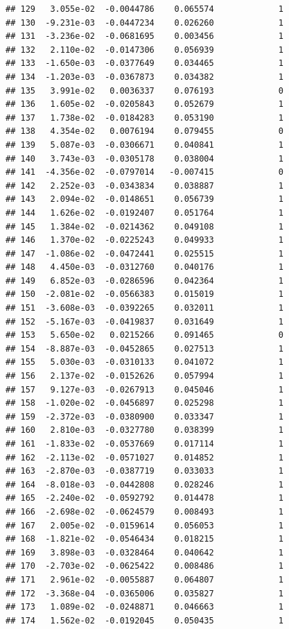 \documentclass[12pt]{article}\usepackage[]{graphicx}\usepackage[]{xcolor}
\makeatletter
\newenvironment{kframe}{%
 \def\at@end@of@kframe{}%
 \ifinner\ifhmode%
  \def\at@end@of@kframe{\end{minipage}}%
  \begin{minipage}{\columnwidth}%
 \fi\fi%
 \def\FrameCommand##1{\hskip\@totalleftmargin \hskip-\fboxsep
 \colorbox{shadecolor}{##1}\hskip-\fboxsep
     \hskip-\linewidth \hskip-\@totalleftmargin \hskip\columnwidth}%
 \MakeFramed {\advance\hsize-\width
   \@totalleftmargin\z@ \linewidth\hsize
   \@setminipage}}%
 {\par\unskip\endMakeFramed%
 \at@end@of@kframe}
\newenvironment{knitrout}{}{} %
\makeatother
\begin{document}
\begin{knitrout}
\begin{kframe}
\begin{verbatim}
## 129   3.055e-02  -0.0044786    0.065574             1
## 130  -9.231e-03  -0.0447234    0.026260             1
## 131  -3.236e-02  -0.0681695    0.003456             1
## 132   2.110e-02  -0.0147306    0.056939             1
## 133  -1.650e-03  -0.0377649    0.034465             1
## 134  -1.203e-03  -0.0367873    0.034382             1
## 135   3.991e-02   0.0036337    0.076193             0
## 136   1.605e-02  -0.0205843    0.052679             1
## 137   1.738e-02  -0.0184283    0.053190             1
## 138   4.354e-02   0.0076194    0.079455             0
## 139   5.087e-03  -0.0306671    0.040841             1
## 140   3.743e-03  -0.0305178    0.038004             1
## 141  -4.356e-02  -0.0797014   -0.007415             0
## 142   2.252e-03  -0.0343834    0.038887             1
## 143   2.094e-02  -0.0148651    0.056739             1
## 144   1.626e-02  -0.0192407    0.051764             1
## 145   1.384e-02  -0.0214362    0.049108             1
## 146   1.370e-02  -0.0225243    0.049933             1
## 147  -1.086e-02  -0.0472441    0.025515             1
## 148   4.450e-03  -0.0312760    0.040176             1
## 149   6.852e-03  -0.0286596    0.042364             1
## 150  -2.081e-02  -0.0566383    0.015019             1
## 151  -3.608e-03  -0.0392265    0.032011             1
## 152  -5.167e-03  -0.0419837    0.031649             1
## 153   5.650e-02   0.0215266    0.091465             0
## 154  -8.887e-03  -0.0452865    0.027513             1
## 155   5.030e-03  -0.0310133    0.041072             1
## 156   2.137e-02  -0.0152626    0.057994             1
## 157   9.127e-03  -0.0267913    0.045046             1
## 158  -1.020e-02  -0.0456897    0.025298             1
## 159  -2.372e-03  -0.0380900    0.033347             1
## 160   2.810e-03  -0.0327780    0.038399             1
## 161  -1.833e-02  -0.0537669    0.017114             1
## 162  -2.113e-02  -0.0571027    0.014852             1
## 163  -2.870e-03  -0.0387719    0.033033             1
## 164  -8.018e-03  -0.0442808    0.028246             1
## 165  -2.240e-02  -0.0592792    0.014478             1
## 166  -2.698e-02  -0.0624579    0.008493             1
## 167   2.005e-02  -0.0159614    0.056053             1
## 168  -1.821e-02  -0.0546434    0.018215             1
## 169   3.898e-03  -0.0328464    0.040642             1
## 170  -2.703e-02  -0.0625422    0.008486             1
## 171   2.961e-02  -0.0055887    0.064807             1
## 172  -3.368e-04  -0.0365006    0.035827             1
## 173   1.089e-02  -0.0248871    0.046663             1
## 174   1.562e-02  -0.0192045    0.050435             1

\end{verbatim}
\end{kframe}
\end{knitrout}
\end{document}
